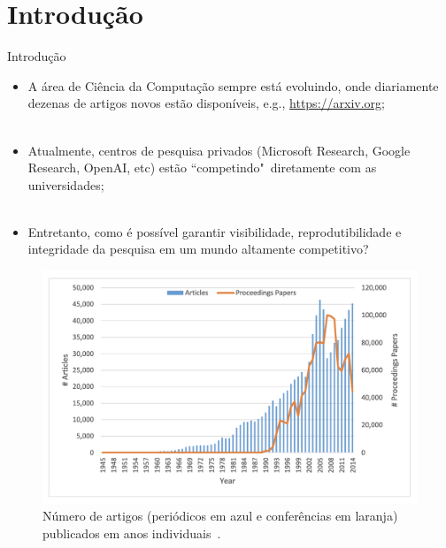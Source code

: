 \section{Introdução}
\label{s.introduction}

\begin{frame}{Introdução}
	\justify 
	\begin{itemize}
		\item<1> A área de Ciência da Computação sempre está evoluindo, onde diariamente dezenas de artigos novos estão disponíveis, e.g., \url{https://arxiv.org};
		\\~\\
		\item<2> Atualmente, centros de pesquisa privados (Microsoft Research, Google Research, OpenAI, etc) estão ``competindo"~diretamente com as universidades;
		\\~\\
		\item<3> Entretanto, como é possível garantir visibilidade, reprodutibilidade e integridade da pesquisa em um mundo altamente competitivo?
	\end{itemize}
\end{frame}


\begin{frame}{}
	\centering
	\begin{figure}
		\includegraphics[scale=0.4]{figs/number_of_papers.png}
		\caption{Número de artigos (periódicos em azul e conferências em laranja) publicados em anos individuais~\cite{Fiala:17}.}
		\label{f.number_of_papers}
	\end{figure}	
\end{frame}